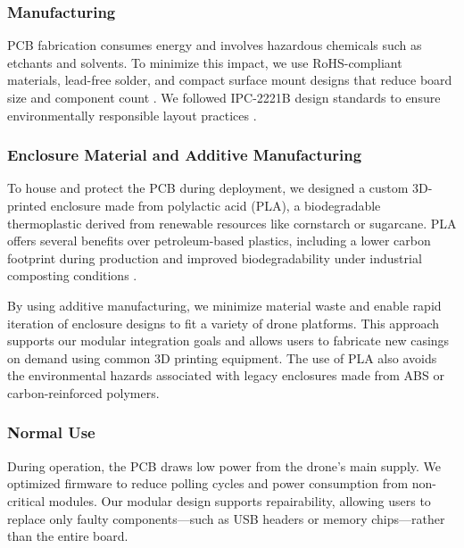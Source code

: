 \documentclass[12pt]{article}
\begin{document}
\subsubsection{Manufacturing}

\par PCB fabrication consumes energy and involves hazardous chemicals such as etchants and solvents. To minimize this impact, we use RoHS-compliant materials, lead-free solder, and compact surface mount designs that reduce board size and component count \cite{rohs}. We followed IPC-2221B design standards to ensure environmentally responsible layout practices \cite{ipc2221}.

\subsubsection{Enclosure Material and Additive Manufacturing}

\par To house and protect the PCB during deployment, we designed a custom 3D-printed enclosure made from polylactic acid (PLA), a biodegradable thermoplastic derived from renewable resources like cornstarch or sugarcane. PLA offers several benefits over petroleum-based plastics, including a lower carbon footprint during production and improved biodegradability under industrial composting conditions \cite{natureworks_pla}.

\par By using additive manufacturing, we minimize material waste and enable rapid iteration of enclosure designs to fit a variety of drone platforms. This approach supports our modular integration goals and allows users to fabricate new casings on demand using common 3D printing equipment. The use of PLA also avoids the environmental hazards associated with legacy enclosures made from ABS or carbon-reinforced polymers.

\subsubsection{Normal Use}

\par During operation, the PCB draws low power from the drone’s main supply. We optimized firmware to reduce polling cycles and power consumption from non-critical modules. Our modular design supports repairability, allowing users to replace only faulty components—such as USB headers or memory chips—rather than the entire board.
\end{document}
